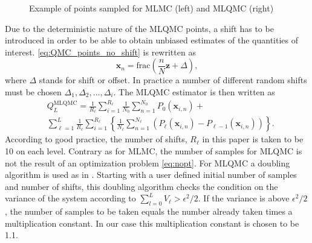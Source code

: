 \documentclass{ICASP13Paper}
\newcommand\fracfun[1]{\textrm{frac}\left(#1\right)}
\begin{document}
\begin{figure}
\begin{subfigure}[b]{0.54\linewidth}
\scalebox{0.4}{
}
\end{subfigure}
\begin{subfigure}[b]{0.45\linewidth}
\scalebox{0.4}{
}
\end{subfigure}
\caption{Example of points sampled for MLMC (left) and MLQMC (right)}
\end{figure}

Due to the deterministic nature of the MLQMC points, a shift has to be introduced in order to be able to obtain unbiased estimates of the quantities of interest. \eqref{eq:QMC_points_no_shift} is rewritten as 
\begin{equation}
\mathbf{x}_n = \fracfun{\frac{n}{N}\mathbf{z} + \Delta},
\end{equation}
where $\Delta$ stands for shift or offset. In practice a number of different random shifts must be chosen $\Delta_1, \Delta_2, ..., \Delta_i$. The MLQMC estimator is then written as 
\begin{equation}
\begin{split}
&Q^{\textrm{MLQMC}}_L= \frac{1}{R_\ell}\sum_{i=1}^{R_\ell}\frac{1}{N_0}\sum_{n=1}^{N_0} P_0(\mathbf{x}_{i,n}) + \\
& \sum_{\ell=1}^L \frac{1}{R_\ell}\sum_{i=1}^{R_\ell}\left \{ \frac{1}{N_\ell} \sum_{n=1}^{N_\ell} \left( P_\ell(\mathbf{x}_{i,n})-P_{\ell-1}(\mathbf{x}_{i,n})\right) \right \}.
\end{split}
\end{equation}
According to good practice, the number of shifts, $R_{\ell}$ in this paper is taken to be 10 on each level. Contrary as for MLMC, the number of samples for MLQMC is not the result of an optimization problem \eqref{eq:nopt}. For MLQMC a doubling algorithm is used as in \cite{Frances}. Starting with a user defined initial number of samples and number of shifts, this doubling algorithm checks the condition on the variance of the system according to $\sum_{l=0}^L V_\ell > \epsilon^2/2$. If the variance is above $\epsilon^2/2$, the number of samples to be taken equals the number already taken times a multiplication constant. In our case this multiplication constant is chosen to be 1.1. 
\end{document}
